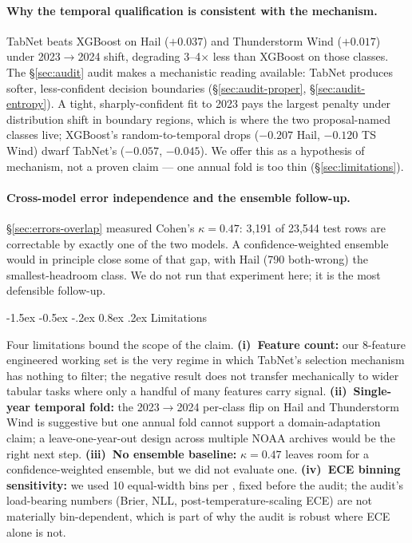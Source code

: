 \documentclass[11pt]{article}
\makeatletter
\renewcommand\section{\@startsection{section}{1}{\z@}%
  {-1.5ex \@plus -0.5ex \@minus -.2ex}%
  {0.8ex \@plus.2ex}%
  {\normalfont\large\bfseries}}
\makeatother
\begin{document}
\paragraph{Why the temporal qualification is consistent with the mechanism.}
TabNet beats XGBoost on Hail ($+0.037$) and Thunderstorm Wind
($+0.017$) under 2023$\rightarrow$2024 shift, degrading 3--4$\times$
less than XGBoost on those classes. The \S\ref{sec:audit} audit
makes a mechanistic reading available: TabNet produces softer,
less-confident decision boundaries
(\S\ref{sec:audit-proper}, \S\ref{sec:audit-entropy}). A tight,
sharply-confident fit to 2023 pays the largest penalty under
distribution shift in boundary regions, which is where the two
proposal-named classes live; XGBoost's random-to-temporal drops
($-0.207$ Hail, $-0.120$ TS Wind) dwarf TabNet's ($-0.057$,
$-0.045$). We offer this as a hypothesis of mechanism, not a proven
claim --- one annual fold is too thin
(\S\ref{sec:limitations}).

\paragraph{Cross-model error independence and the ensemble follow-up.}
\S\ref{sec:errors-overlap} measured Cohen's $\kappa = 0.47$:
3{,}191 of 23{,}544 test rows are correctable by exactly one of the
two models. A confidence-weighted ensemble would in principle close
some of that gap, with Hail (790 both-wrong) the smallest-headroom
class. We do not run that experiment here; it is the most
defensible follow-up.

\section{Limitations}\label{sec:limitations}

Four limitations bound the scope of the claim.
\textbf{(i)~Feature count:} our 8-feature engineered working set is
the very regime in which TabNet's selection mechanism has nothing
to filter; the negative result does not transfer mechanically to
wider tabular tasks where only a handful of many features carry
signal. \textbf{(ii)~Single-year temporal fold:} the
2023$\rightarrow$2024 per-class flip on Hail and Thunderstorm Wind
is suggestive but one annual fold cannot support a domain-adaptation
claim; a leave-one-year-out design across multiple NOAA archives
would be the right next step. \textbf{(iii)~No ensemble baseline:}
$\kappa = 0.47$ leaves room for a confidence-weighted ensemble, but
we did not evaluate one. \textbf{(iv)~ECE binning sensitivity:} we
used 10 equal-width bins per \citet{guo2017calibration}, fixed
before the audit; the audit's load-bearing numbers (Brier, NLL,
post-temperature-scaling ECE) are not materially bin-dependent,
which is part of why the audit is robust where ECE alone is not.
\end{document}
